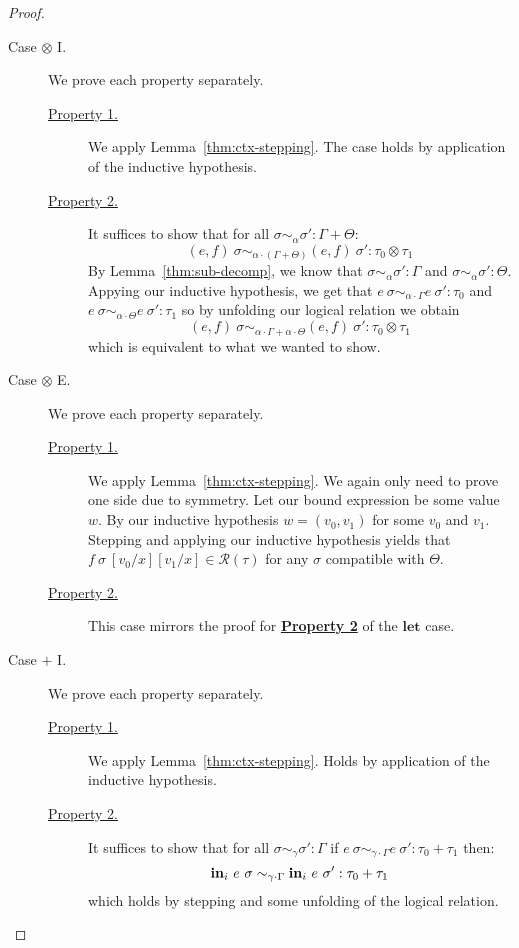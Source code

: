 \begin{proof}
\begin{description}
    \item[Case $\otimes$ I.] 
      We prove each property separately.
      \begin{description}
        \item[\underline{Property 1.}]
          We apply Lemma~\ref{thm:ctx-stepping}.
          The case holds by application of the inductive hypothesis.
        \item[\underline{Property 2.}]
          It suffices to show that for all 
          $\sigma \sim_{\alpha} \sigma' : \Gamma + \Theta$:
          $$
          (e, f)~\sigma \sim_{\alpha \cdot (\Gamma + \Theta)} (e, f)~\sigma' :
          \tau_0 \otimes \tau_1
          $$
          By Lemma~\ref{thm:sub-decomp}, we know that 
          $\sigma \sim_{\alpha} \sigma' : \Gamma$ and
          $\sigma \sim_{\alpha} \sigma' : \Theta$.
          Appying our inductive hypothesis, we get that
          $e~\sigma \sim_{\alpha \cdot \Gamma} e~\sigma' : \tau_0$ and
          $e~\sigma \sim_{\alpha \cdot \Theta} e~\sigma' : \tau_1$
          so by unfolding our logical relation we obtain
          $$
          (e, f)~\sigma \sim_{\alpha \cdot \Gamma + \alpha \cdot \Theta} (e, f)~\sigma' :
          \tau_0 \otimes \tau_1
          $$
          which is equivalent to what we wanted to show.
      \end{description}

    \item[Case $\otimes$ E.] 
      We prove each property separately.
      \begin{description}
        \item[\underline{Property 1.}]
          We apply Lemma~\ref{thm:ctx-stepping}.
          We again only need to prove one side due to symmetry. Let our bound
          expression be some value $w$. By our inductive hypothesis $w = (v_0,
          v_1)$ for some $v_0$ and $v_1$. Stepping and applying our inductive
          hypothesis yields that $f~\sigma~[v_0/x][v_1/x] \in
          \mathcal{R}(\tau)$ for any $\sigma$ compatible with $\Theta$.
        \item[\underline{Property 2.}]
          This case mirrors the proof for \textbf{\underline{Property 2}} of the
          $\textbf{let}$ case.
      \end{description}

    \item[Case $+$ I.] 
      We prove each property separately.
      \begin{description}
        \item[\underline{Property 1.}]
          We apply Lemma~\ref{thm:ctx-stepping}.
          Holds by application of the inductive hypothesis.
        \item[\underline{Property 2.}]
          It suffices to show that for all $\sigma \sim_{\gamma} \sigma' : \Gamma$
          if $e~\sigma \sim_{\gamma \cdot \Gamma} e~\sigma' : \tau_0 + \tau_1$
          then:
          $$
          \textbf{in}_i~e~\sigma \sim_{\gamma \cdot \Gamma} \textbf{in}_i~e~\sigma' : \tau_0 +
          \tau_1
          $$
          which holds by stepping and some unfolding of the logical relation.
      \end{description}


\end{description}
\end{proof}
